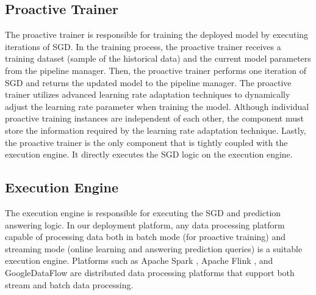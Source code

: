 \subsection{Proactive Trainer} 
The proactive trainer is responsible for training the deployed model by executing iterations of SGD.
In the training process, the proactive trainer receives a training dataset (sample of the historical data) and the current model parameters from the pipeline manager.
Then, the proactive trainer performs one iteration of SGD and returns the updated model to the pipeline manager.
The proactive trainer utilizes advanced learning rate adaptation techniques to dynamically adjust the learning rate parameter when training the model.
Although individual proactive training instances are independent of each other, the component must store the information required by the learning rate adaptation technique.
Lastly, the proactive trainer is the only component that is tightly coupled with the execution engine.
It directly executes the SGD logic on the execution engine.

\subsection{Execution Engine}
The execution engine is responsible for executing the SGD and prediction answering logic.
In our deployment platform, any data processing platform capable of processing data both in batch mode (for proactive training) and streaming mode (online learning and answering prediction queries) is a suitable execution engine.
Platforms such as Apache Spark \cite{zaharia2010spark}, Apache Flink \cite{carbone2015apache}, and GoogleDataFlow \cite{akidau2015dataflow} are distributed data processing platforms that support both stream and batch data processing.